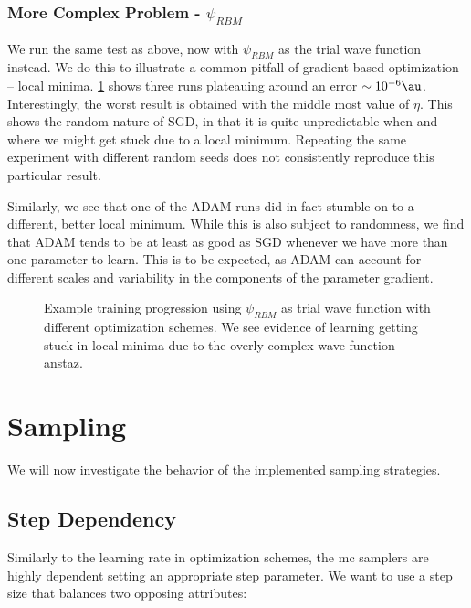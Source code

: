 \documentclass[Thesis.tex]{subfiles}
\begin{document}
\subsubsection{More Complex Problem - $\psi_{RBM}$}

We run the same test as above, now with $\psi_{RBM}$ as the trial wave function
instead. We do this to illustrate a common pitfall of gradient-based
optimization -- local minima. \cref{fig:verify-lr-rbm} shows three runs
plateauing around an error $\sim 10^{-6}\si{\au}$. Interestingly, the worst
result is obtained with the middle most value of $\eta$. This shows the random
nature of SGD, in that it is quite unpredictable when and where we might get
stuck due to a local minimum. Repeating the same experiment with different random
seeds does not consistently reproduce this particular result.

Similarly, we see that one of the ADAM runs did in fact stumble on to a
different, better local minimum. While this is also subject to randomness, we
find that ADAM tends to be at least as good as SGD whenever we have more than
one parameter to learn. This is to be expected, as ADAM can account for
different scales and variability in the components of the parameter gradient.

\begin{figure}[h]
  \centering
    \resizebox{\linewidth}{!}{%
      
    }
  \caption[Comparison of optimization schemes on a complicated problem]{\label{fig:verify-lr-rbm}Example training progression using
    $\psi_{RBM}$ as trial wave function with different optimization schemes. We
    see evidence of learning getting stuck in local minima due to the overly
    complex wave function anstaz.}
\end{figure}


\section{Sampling}
\label{sec:verify-sampling}

We will now investigate the behavior of the implemented sampling strategies.

\subsection{Step Dependency}

Similarly to the learning rate in optimization schemes, the \gls{mc} samplers
are highly dependent setting an appropriate step parameter. We want to use a
step size that balances two opposing attributes:
\end{document}
